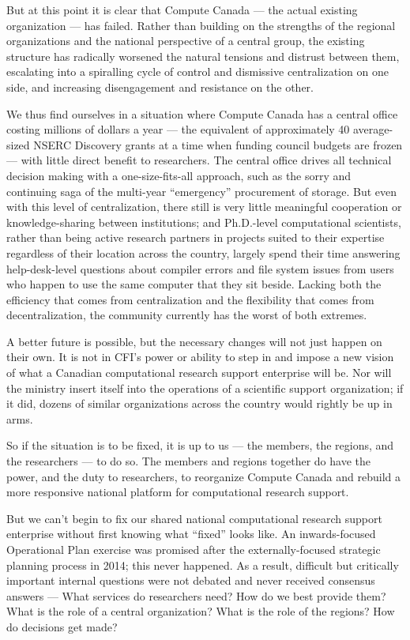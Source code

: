 \documentclass[11pt]{article}
\begin{document}
But at this point it is clear that Compute Canada --- the actual existing
organization --- has failed.  Rather than building on the strengths
of the regional organizations and the national perspective of a
central group, the existing structure has radically worsened the natural tensions 
and distrust between them, escalating into a spiralling cycle of control and
dismissive centralization on one side, and increasing disengagement and resistance
on the other.

We thus find ourselves in a situation where Compute Canada has a central office
costing millions of dollars a year --- the equivalent of approximately
40 average-sized NSERC Discovery grants at a time when funding
council budgets are frozen --- with little direct benefit to
researchers.  The central office drives all technical decision
making with a one-size-fits-all approach, such as the sorry and
continuing saga of the multi-year \enquote{emergency} procurement
of storage.  But even with this level of centralization, there still
is very little meaningful cooperation or knowledge-sharing between
institutions; and Ph.D.-level computational scientists, rather than
being active research partners in projects suited to their expertise
regardless of their location across the country, largely spend their
time answering help-desk-level questions about compiler errors and
file system issues from users who happen to use the same computer
that they sit beside.  Lacking both the efficiency that comes from
centralization and the flexibility that comes from decentralization,
the community currently has the worst of both extremes.

A better future is possible, but the necessary changes will not
just happen on their own.  It is not in CFI's power or ability to
step in and impose a new vision of what a Canadian computational
research support enterprise will be.  Nor will the ministry insert
itself into the operations of a scientific support organization;
if it did, dozens of similar organizations across the country would
rightly be up in arms.

So if the situation is to be fixed, it is up to us --- the members, the regions,
and the researchers --- to do so.  The members and regions together do have
the power, and the duty to researchers, to reorganize Compute Canada and 
rebuild a more responsive national platform for computational research support.  

But we can't begin to fix our shared national computational research support 
enterprise without first knowing what \enquote{fixed} looks like.  An inwards-focused 
Operational Plan exercise was promised after the externally-focused 
strategic planning process in 2014; this never happened.  As a result, 
difficult but critically important internal questions were not debated and
never received consensus answers ---  What services do researchers need?
How do we best provide them?  What is the role of a central organization? 
What is the role of the regions?  How do decisions get made?
\end{document}
